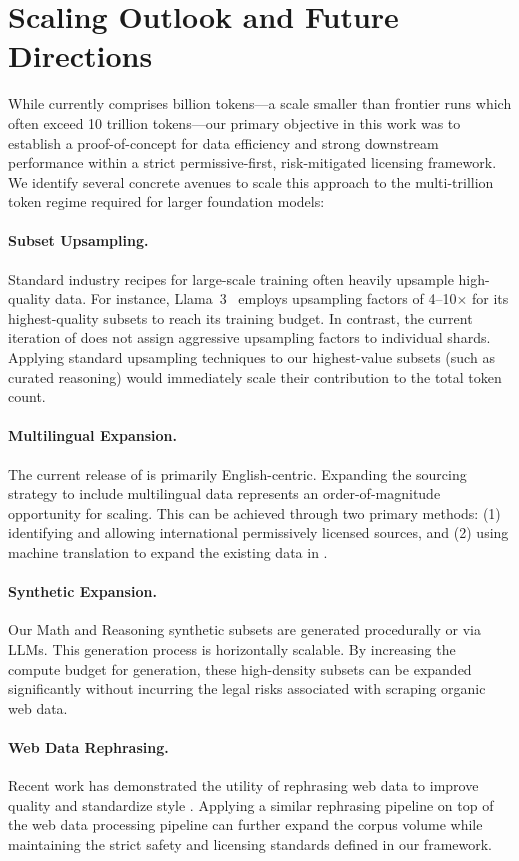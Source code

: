 \section{Scaling Outlook and Future Directions}
\label{app:scaling_outlook}

While \MixtureVitae{} currently comprises \DatasetSize{} billion tokens---a scale smaller than frontier runs which often exceed 10 trillion tokens---our primary objective in this work was to establish a proof-of-concept for data efficiency and strong downstream performance within a strict permissive-first, risk-mitigated licensing framework. We identify several concrete avenues to scale this approach to the multi-trillion token regime required for larger foundation models:

\paragraph{Subset Upsampling.} 
Standard industry recipes for large-scale training often heavily upsample high-quality data. For instance, Llama~3~\citep{Meta2024_Llama3} employs upsampling factors of 4--10$\times$ for its highest-quality subsets to reach its training budget. In contrast, the current iteration of \MixtureVitae{} does not assign aggressive upsampling factors to individual shards. Applying standard upsampling techniques to our highest-value subsets (such as curated reasoning) would immediately scale their contribution to the total token count.

\paragraph{Multilingual Expansion.} 
The current release of \MixtureVitae{} is primarily English-centric. Expanding the sourcing strategy to include multilingual data represents an order-of-magnitude opportunity for scaling. This can be achieved through two primary methods: (1) identifying and allowing international permissively licensed sources, and (2) using machine translation to expand the existing data in \MixtureVitae{}.

\paragraph{Synthetic Expansion.} 
Our Math and Reasoning synthetic subsets are generated procedurally or via LLMs. This generation process is horizontally scalable. By increasing the compute budget for generation, these high-density subsets can be expanded significantly without incurring the legal risks associated with scraping organic web data.

\paragraph{Web Data Rephrasing.} 
Recent work has demonstrated the utility of rephrasing web data to improve quality and standardize style \citep{maini2024rephrasing}. Applying a similar rephrasing pipeline on top of the \MixtureVitae{} web data processing pipeline can further expand the corpus volume while maintaining the strict safety and licensing standards defined in our framework.